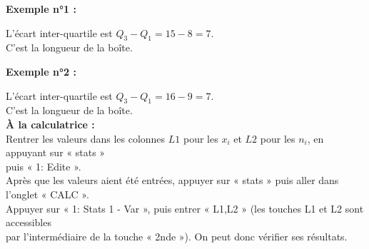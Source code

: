 \textbf{Exemple n°1 :}


\vspace*{.3cm}

L'écart inter-quartile est $Q_3 - Q_1 = 15 - 8 = 7$. \\ C'est la longueur de la boîte.


\textbf{Exemple n°2 :}


L'écart inter-quartile est $Q_3 - Q_1 = 16 - 9 = 7$. \\ C'est la longueur de la boîte. \\

\textbf{À la calculatrice :} \\

Rentrer les valeurs dans les colonnes $L1$ pour les $x_i$ et $L2$ pour les $n_i$, en appuyant sur « stats » \\ puis « 1: Edite ». \\
Après que les valeurs aient été entrées, appuyer sur « stats » puis aller dans l'onglet « CALC ». \\ Appuyer sur « 1: Stats 1 - Var », puis entrer « L1,L2 » (les touches L1 et L2 sont accessibles \\ par l'intermédiaire de la touche « 2nde »). On peut donc vérifier ses résultats. \\

